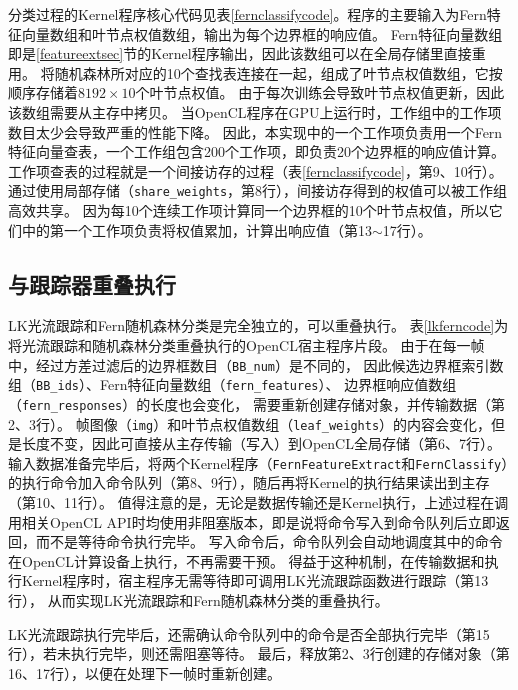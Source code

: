分类过程的Kernel程序核心代码见表\ref{fernclassifycode}。程序的主要输入为Fern特征向量数组和叶节点权值数组，输出为每个边界框的响应值。
Fern特征向量数组即是\ref{featureextsec}节的Kernel程序输出，因此该数组可以在全局存储里直接重用。
将随机森林所对应的10个查找表连接在一起，组成了叶节点权值数组，它按顺序存储着$8192\times10$个叶节点权值。
由于每次训练会导致叶节点权值更新，因此该数组需要从主存中拷贝。
当OpenCL程序在GPU上运行时，工作组中的工作项数目太少会导致严重的性能下降。
因此，本实现中的一个工作项负责用一个Fern特征向量查表，一个工作组包含200个工作项，即负责20个边界框的响应值计算。
工作项查表的过程就是一个间接访存的过程（表\ref{fernclassifycode}，第9、10行）。
通过使用局部存储（\texttt{share\_weights}，第8行），间接访存得到的权值可以被工作组高效共享。
因为每10个连续工作项计算同一个边界框的10个叶节点权值，所以它们中的第一个工作项负责将权值累加，计算出响应值（第13$\sim$17行）。

\subsection{与跟踪器重叠执行}
\label{detecttrackoverlapsec}
LK光流跟踪和Fern随机森林分类是完全独立的，可以重叠执行。
表\ref{lkferncode}为将光流跟踪和随机森林分类重叠执行的OpenCL宿主程序片段。
由于在每一帧中，经过方差过滤后的边界框数目（\texttt{BB\_num}）是不同的，
因此候选边界框索引数组（\texttt{BB\_ids}）、Fern特征向量数组（\texttt{fern\_features}）、
边界框响应值数组（\texttt{fern\_responses}）的长度也会变化，
需要重新创建存储对象，并传输数据（第2、3行）。
帧图像（\texttt{img}）和叶节点权值数组（\texttt{leaf\_weights}）的内容会变化，但是长度不变，因此可直接从主存传输（写入）到OpenCL全局存储（第6、7行）。
输入数据准备完毕后，将两个Kernel程序（\texttt{FernFeatureExtract}和\texttt{FernClassify}）的执行命令加入命令队列（第8、9行），随后再将Kernel的执行结果读出到主存（第10、11行）。
值得注意的是，无论是数据传输还是Kernel执行，上述过程在调用相关OpenCL API时均使用非阻塞版本，即是说将命令写入到命令队列后立即返回，而不是等待命令执行完毕。
写入命令后，命令队列会自动地调度其中的命令在OpenCL计算设备上执行，不再需要干预。
得益于这种机制，在传输数据和执行Kernel程序时，宿主程序无需等待即可调用LK光流跟踪函数进行跟踪（第13行），
从而实现LK光流跟踪和Fern随机森林分类的重叠执行。

LK光流跟踪执行完毕后，还需确认命令队列中的命令是否全部执行完毕（第15行），若未执行完毕，则还需阻塞等待。
最后，释放第2、3行创建的存储对象（第16、17行），以便在处理下一帧时重新创建。

